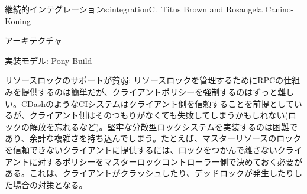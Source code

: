 \begin{aosachapter}{継続的インテグレーション}{s:integration}{C.\ Titus Brown and Rosangela Canino-Koning}
\begin{aosasect1}{アーキテクチャ}
\begin{aosasect2}{実装モデル: Pony-Build}
\begin{aosadescription}
  \item{リソースロックのサポートが貧弱:} リソースロックを管理するためにRPCの仕組みを提供するのは簡単だが、クライアントポリシーを強制するのはずっと難しい。CDashのようなCIシステムはクライアント側を信頼することを前提としているが、クライアント側はそのつもりがなくても失敗してしまうかもしれない(ロックの解放を忘れるなど)。堅牢な分散型ロックシステムを実装するのは困難であり、余計な複雑さを持ち込んでしまう。たとえば、マスターリソースのロックを信頼できないクライアントに提供するには、ロックをつかんで離さないクライアントに対するポリシーをマスターロックコントローラー側で決めておく必要がある。これは、クライアントがクラッシュしたり、デッドロックが発生したりした場合の対策となる。


\end{aosadescription}
\end{aosasect2}
\end{aosasect1}
\end{aosachapter}
